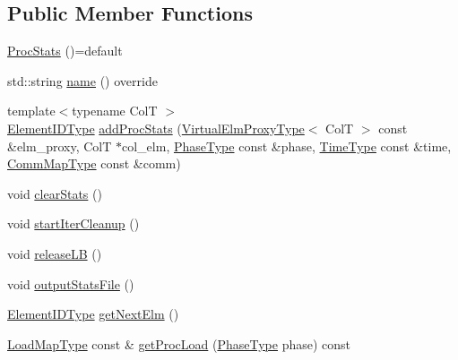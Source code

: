 \subsection*{Public Member Functions}
\begin{DoxyCompactItemize}
\item 
\hyperlink{structvt_1_1vrt_1_1collection_1_1balance_1_1_proc_stats_aa3495f8e610964b594e6dc4d3998d5b2}{Proc\+Stats} ()=default
\item 
std\+::string \hyperlink{structvt_1_1vrt_1_1collection_1_1balance_1_1_proc_stats_a19a950a19ad62c0dddff07d50d060114}{name} () override
\item 
{\footnotesize template$<$typename ColT $>$ }\\\hyperlink{namespacevt_1_1vrt_1_1collection_1_1balance_a14c8d2c972f2913aa3f1636e5be0a120}{Element\+I\+D\+Type} \hyperlink{structvt_1_1vrt_1_1collection_1_1balance_1_1_proc_stats_ae9ec0e9f6af7d5e84c2260170a56c611}{add\+Proc\+Stats} (\hyperlink{namespacevt_1_1vrt_a620a5c8c59d13e513f690c74b4af516f}{Virtual\+Elm\+Proxy\+Type}$<$ ColT $>$ const \&elm\+\_\+proxy, ColT $\ast$col\+\_\+elm, \hyperlink{namespacevt_a46ce6733d5cdbd735d561b7b4029f6d7}{Phase\+Type} const \&phase, \hyperlink{namespacevt_a876a9d0cd5a952859c72de8a46881442}{Time\+Type} const \&time, \hyperlink{namespacevt_1_1vrt_1_1collection_1_1balance_aa50d4cbbfa3c643e7303fc6e08f411fb}{Comm\+Map\+Type} const \&comm)
\item 
void \hyperlink{structvt_1_1vrt_1_1collection_1_1balance_1_1_proc_stats_a9a47e5d00d2645f76f2a21e75996fe8b}{clear\+Stats} ()
\item 
void \hyperlink{structvt_1_1vrt_1_1collection_1_1balance_1_1_proc_stats_a6b8af21b777599060c4a532a5adb0100}{start\+Iter\+Cleanup} ()
\item 
void \hyperlink{structvt_1_1vrt_1_1collection_1_1balance_1_1_proc_stats_a7865efba4c984b1b77a93b5cd04dc861}{release\+LB} ()
\item 
void \hyperlink{structvt_1_1vrt_1_1collection_1_1balance_1_1_proc_stats_a543211533c1c2c348137069e945432a5}{output\+Stats\+File} ()
\item 
\hyperlink{namespacevt_1_1vrt_1_1collection_1_1balance_a14c8d2c972f2913aa3f1636e5be0a120}{Element\+I\+D\+Type} \hyperlink{structvt_1_1vrt_1_1collection_1_1balance_1_1_proc_stats_aff0ecd6f0016ebd074b982caad107806}{get\+Next\+Elm} ()
\item 
\hyperlink{structvt_1_1vrt_1_1collection_1_1balance_1_1_proc_stats_aa810fd21680061ec5d50f6526f66be31}{Load\+Map\+Type} const  \& \hyperlink{structvt_1_1vrt_1_1collection_1_1balance_1_1_proc_stats_a58efd15cd33db3c5ce9ba8677feb486b}{get\+Proc\+Load} (\hyperlink{namespacevt_a46ce6733d5cdbd735d561b7b4029f6d7}{Phase\+Type} phase) const

\end{DoxyCompactItemize}
